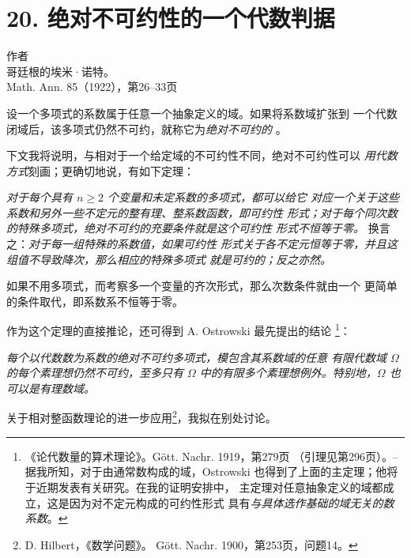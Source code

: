 \section*{20. 绝对不可约性的一个代数判据}
\begin{center}
作者\\[0.25em]
哥廷根的埃米·诺特。\\[0.6em]
Math. Ann. 85（1922），第26--33页
\end{center}

设一个多项式的系数属于任意一个抽象定义的域。如果将系数域扩张到
一个代数闭域后，该多项式仍然不可约，就称它为\emph{绝对不可约的}
。\addtocounter{footnote}{1}
下文我将说明，与相对于一个给定域的不可约性不同，绝对不可约性可以
\emph{用代数方式}刻画；更确切地说，有如下定理：

\emph{对于每个具有 \(n\ge2\) 个变量和未定系数的多项式，都可以给它
对应一个关于这些系数和另外一些不定元的整有理、整系数函数，即可约性
形式；对于每个同次数的特殊多项式，绝对不可约的充要条件就是这个可约性
形式不恒等于零。} 换言之：\emph{对于每一组特殊的系数值，如果可约性
形式关于各不定元恒等于零，并且这组值不导致降次，那么相应的特殊多项式
就是可约的；反之亦然。}

如果不用多项式，而考察多一个变量的齐次形式，那么次数条件就由一个
更简单的条件取代，即系数系不恒等于零。

作为这个定理的直接推论，还可得到 A. Ostrowski 最先提出的结论
\footnote{《论代数量的算术理论》。Gött. Nachr. 1919，第279页
（引理见第296页）。-- 据我所知，对于由通常数构成的域，Ostrowski
也得到了上面的主定理；他将于近期发表有关研究。在我的证明安排中，
主定理对任意抽象定义的域都成立，这是因为对不定元构成的可约性形式
具有\emph{与具体选作基础的域无关的数系数}。}：

\emph{每个以代数数为系数的绝对不可约多项式，模包含其系数域的任意
有限代数域 \(\Omega\) 的每个素理想仍然不可约，至多只有 \(\Omega\)
中的有限多个素理想例外。特别地，\(\Omega\) 也可以是有理数域。}

关于相对整函数理论的进一步应用\footnote{D. Hilbert，《数学问题》。
Gött. Nachr. 1900，第253页，问题14。}，我拟在别处讨论。

